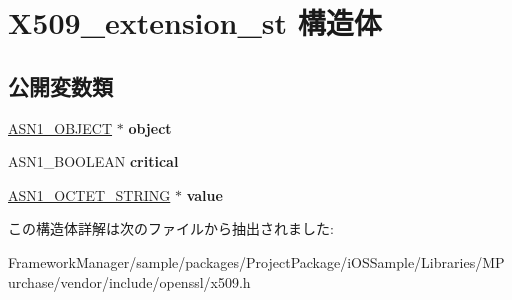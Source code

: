 \hypertarget{struct_x509__extension__st}{}\section{X509\+\_\+extension\+\_\+st 構造体}
\label{struct_x509__extension__st}
\subsection*{公開変数類}
\begin{DoxyCompactItemize}
\item 
\hypertarget{struct_x509__extension__st_a8aea7d682ad5be95235abe897c0160fa}{}\hyperlink{structasn1__object__st}{A\+S\+N1\+\_\+\+O\+B\+J\+E\+C\+T} $\ast$ {\bfseries object}\label{struct_x509__extension__st_a8aea7d682ad5be95235abe897c0160fa}

\item 
\hypertarget{struct_x509__extension__st_a143f7da8b44e344f89faf5ffc657031b}{}A\+S\+N1\+\_\+\+B\+O\+O\+L\+E\+A\+N {\bfseries critical}\label{struct_x509__extension__st_a143f7da8b44e344f89faf5ffc657031b}

\item 
\hypertarget{struct_x509__extension__st_a670220c7ca6eef25dde30f43db492114}{}\hyperlink{structasn1__string__st}{A\+S\+N1\+\_\+\+O\+C\+T\+E\+T\+\_\+\+S\+T\+R\+I\+N\+G} $\ast$ {\bfseries value}\label{struct_x509__extension__st_a670220c7ca6eef25dde30f43db492114}

\end{DoxyCompactItemize}


この構造体詳解は次のファイルから抽出されました\+:\begin{DoxyCompactItemize}
\item 
Framework\+Manager/sample/packages/\+Project\+Package/i\+O\+S\+Sample/\+Libraries/\+M\+Purchase/vendor/include/openssl/x509.\+h\end{DoxyCompactItemize}
